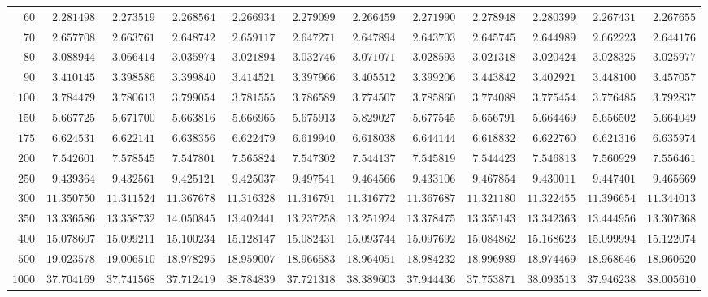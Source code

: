 \begin{sidewaystable}
\begin{tabular}{r|rrrrrrrrrrr}
$60$ & $2.281498$ & $2.273519$ & $2.268564$ & $2.266934$ & $2.279099$ & $2.266459$ & $2.271990$ & $2.278948$ & $2.280399$ & $2.267431$ & $2.267655$ \\
$70$ & $2.657708$ & $2.663761$ & $2.648742$ & $2.659117$ & $2.647271$ & $2.647894$ & $2.643703$ & $2.645745$ & $2.644989$ & $2.662223$ & $2.644176$ \\
$80$ & $3.088944$ & $3.066414$ & $3.035974$ & $3.021894$ & $3.032746$ & $3.071071$ & $3.028593$ & $3.021318$ & $3.020424$ & $3.028325$ & $3.025977$ \\
$90$ & $3.410145$ & $3.398586$ & $3.399840$ & $3.414521$ & $3.397966$ & $3.405512$ & $3.399206$ & $3.443842$ & $3.402921$ & $3.448100$ & $3.457057$ \\
$100$ & $3.784479$ & $3.780613$ & $3.799054$ & $3.781555$ & $3.786589$ & $3.774507$ & $3.785860$ & $3.774088$ & $3.775454$ & $3.776485$ & $3.792837$ \\
$150$ & $5.667725$ & $5.671700$ & $5.663816$ & $5.666965$ & $5.675913$ & $5.829027$ & $5.677545$ & $5.656791$ & $5.664469$ & $5.656502$ & $5.664049$ \\
$175$ & $6.624531$ & $6.622141$ & $6.638356$ & $6.622479$ & $6.619940$ & $6.618038$ & $6.644144$ & $6.618832$ & $6.622760$ & $6.621316$ & $6.635974$ \\
$200$ & $7.542601$ & $7.578545$ & $7.547801$ & $7.565824$ & $7.547302$ & $7.544137$ & $7.545819$ & $7.544423$ & $7.546813$ & $7.560929$ & $7.556461$ \\
$250$ & $9.439364$ & $9.432561$ & $9.425121$ & $9.425037$ & $9.497541$ & $9.464566$ & $9.433106$ & $9.467854$ & $9.430011$ & $9.447401$ & $9.465669$ \\
$300$ & $11.350750$ & $11.311524$ & $11.367678$ & $11.316328$ & $11.316791$ & $11.316772$ & $11.367687$ & $11.321180$ & $11.322455$ & $11.396654$ & $11.344013$ \\
$350$ & $13.336586$ & $13.358732$ & $14.050845$ & $13.402441$ & $13.237258$ & $13.251924$ & $13.378475$ & $13.355143$ & $13.342363$ & $13.444956$ & $13.307368$ \\
$400$ & $15.078607$ & $15.099211$ & $15.100234$ & $15.128147$ & $15.082431$ & $15.093744$ & $15.097692$ & $15.084862$ & $15.168623$ & $15.099994$ & $15.122074$ \\
$500$ & $19.023578$ & $19.006510$ & $18.978295$ & $18.959007$ & $18.966583$ & $18.964051$ & $18.984232$ & $18.996989$ & $18.974469$ & $18.968646$ & $18.960620$ \\
$1000$ & $37.704169$ & $37.741568$ & $37.712419$ & $38.784839$ & $37.721318$ & $38.389603$ & $37.944436$ & $37.753871$ & $38.093513$ & $37.946238$ & $38.005610$ \\
\hline
\end{tabular}
\end{sidewaystable}
 
